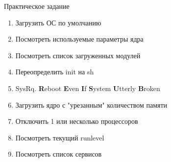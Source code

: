 \begin{frame}{Практическое задание}
	\begin{enumerate}
		\item Загрузить ОС по умолчанию
		\item Посмотреть используемые параметры ядра 
		\item Посмотреть список загруженных модулей
			\pause
		\item Переопределить init на sh
		\item SysRq. {\bf R}eboot {\bf E}ven {\bf I}f {\bf S}ystem {\bf U}tterly {\bf B}roken
			\pause
		\item Загрузить ядро с "урезанным" количеством памяти
		\item Отключить 1 или несколько процессоров
			\pause
		\item Посмотреть текущий runlevel
		\item Посмотреть список сервисов
	\end{enumerate}
\end{frame}
